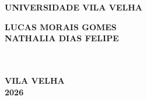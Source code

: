 \thispagestyle{empty}

\vfill
 \begin{center}
    

    {\large\bfseries UNIVERSIDADE VILA VELHA} \\
    

    \vspace*{1in}
    \begin{large} \bfseries LUCAS MORAIS GOMES \\ NATHALIA DIAS FELIPE \end{large}\\[0.4in]

    \vspace*{4cm}
    \noindent \\
    
    \large\bfseries{}
    \vfill
    \large\bfseries{VILA VELHA \\2026}
\end{center}

\normalsize


